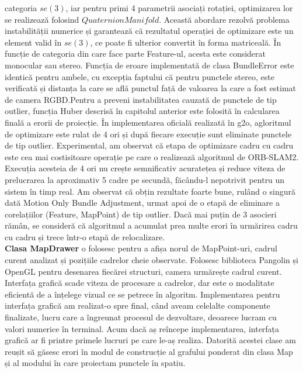 \documentclass[12pt,a4paper]{report}
\begin{document}
categoria $ se(3) $, iar pentru primi 4 parametrii asociați rotației, optimizarea lor se realizează
folosind $ QuaternionManifold $. Această abordare rezolvă problema instabilității numerice și 
garantează că rezultatul operației de optimizare este un element valid în $ se(3) $, ce poate fi 
ulterior convertit în forma matriceală. În funcție de categoria din care face parte Feature-ul, 
acesta este considerat monocular sau stereo. Funcția de eroare implementată de clasa BundleError 
este identică pentru ambele, cu excepția faptului că pentru punctele stereo, este verificată și distanța 
la care se află punctul față de valoarea la care a fost estimat de camera RGBD.\@ Pentru a preveni
instabilitatea cauzată de punctele de tip outlier, funcția Huber descrisă în capitolul anterior este
folosită în calcularea finală a erorii de proiecție. În implementarea oficială realizată în g2o, 
agloritmul de optimizare este rulat de 4 ori și după fiecare execuție sunt eliminate punctele de tip 
outlier. Experimental, am observat că etapa de optimizare cadru cu cadru este cea mai costisitoare 
operație pe care o realizează algoritmul de ORB-SLAM2. Execuția acesteia de 4 ori nu crește 
semnificativ acuratețea și reduce viteza de prelucrarea la aproximativ 5 cadre pe secundă, făcându-l 
nepotrivit pentru un sistem în timp real. Am observat că obțin rezultate foarte bune, rulând o singură
dată Motion Only Bundle Adjustment, urmat apoi de o etapă de eliminare a corelațiilor 
(Feature, MapPoint) de tip outlier. Dacă mai puțin de 3 asocieri rămân, se consideră că algoritmul
a acumulat prea multe erori în urmărirea cadru cu cadru și trece într-o etapă de relocalizare. \\

\textbf{Clasa MapDrawer} o folosesc pentru a afișa norul de MapPoint-uri,
cadrul curent analizat și pozițiile cadrelor cheie observate. Folosesc biblioteca Pangolin și 
OpenGL pentru desenarea fiecărei structuri, camera urmărește cadrul curent. Interfața grafică 
scade viteza de procesare a cadrelor, dar este o modalitate eficientă de a înțelege vizual ce 
se petrece în algoritm. Implementarea pentru interfața grafică am realizat-o spre final, când 
aveam celelalte componente finalizate, lucru care a îngreunat procesul de dezvoltare, deoarece 
lucram cu valori numerice în terminal. Acum dacă aș reîncepe implementarea, interfața grafică ar fi
printre primele lucruri pe care le-aș realiza. Datorită acestei clase am reușit să găsesc erori în
modul de construcție al grafului ponderat din clasa Map și al modului în care proiectam punctele 
în spatiu.
\end{document}
